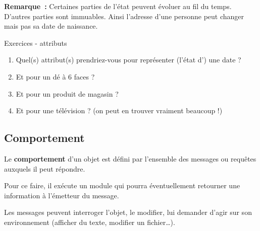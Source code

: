 		\textbf{Remarque}\textbf{~: }Certaines parties de
		l'état peuvent évoluer au fil du temps.
		D'autres parties sont immuables. 
		Ainsi l'adresse d'une personne peut changer
		mais pas sa date de naissance.

		\begin{Emphase}{Exercices - attributs}
			\remonter
			\begin{enumerate}
				\item 
					Quel(s) attribut(s) prendriez-vous pour représenter
					(l'état d') une date ?
				\item 
					Et pour un dé à 6 faces ?
				\item 
					Et pour un produit de magasin ?
				\item 
					Et pour une télévision ?
					(on peut en trouver vraiment beaucoup !)
			\end{enumerate}
		\end{Emphase}

	\subsection{Comportement}

		Le \textbf{comportement} d'un objet est défini par
		l'ensemble des messages ou requêtes auxquels il peut répondre.

		Pour ce faire, il exécute un module qui pourra
		éventuellement retourner une information à l'émetteur
		du message.
		
		Les messages peuvent interroger l'objet, le modifier,
		lui demander d'agir sur son environnement (afficher du
		texte, modifier un fichier\dots). 

